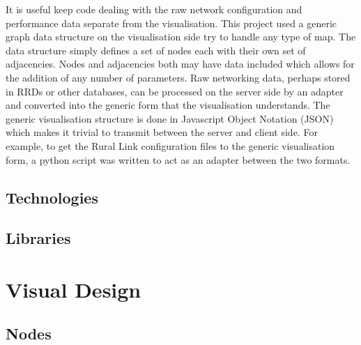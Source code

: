 \documentclass{article}
\begin{document}
It is useful keep code dealing with the raw network configuration and
performance data separate from the visualisation. This project used a generic
graph data structure on the visualisation side try to handle any type of map.
The data structure simply defines a set of nodes each with their own set of
adjacencies. Nodes and adjacencies both may have data included which allows for
the addition of any number of parameters. Raw networking data, perhaps stored in
RRDs or other databases, can be processed on the server side by an adapter and
converted into the generic form that the visualisation understands.  The generic
visualisation structure is done in Javascript Object Notation (JSON) which makes
it trivial to transmit between the server and client side. \cite{rfc4627}  For
example, to get the Rural Link configuration files to the generic visualisation
form, a python script was written to act as an adapter between the two formats. 


\subsection{Technologies}
\label{sec:technologies}

\subsection{Libraries}
\label{sec:libraries}

\section{Visual Design}
\label{sec:visual-design}

\subsection{Nodes}
\label{sec:nodes}
\end{document}
